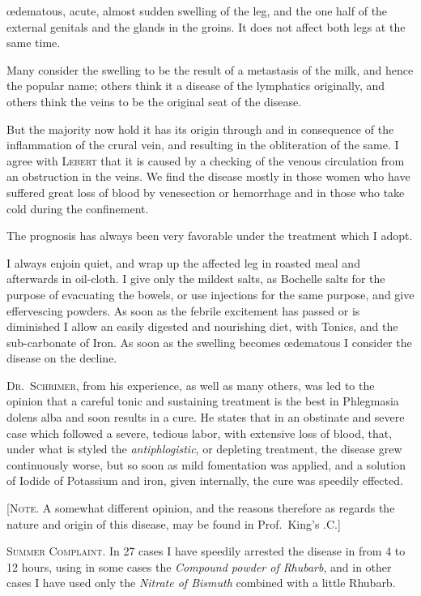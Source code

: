 œdematous, acute, almost sudden swelling of the leg, and the one half
of the external genitals and the glands in the groins. It does not
affect both legs at the same time.

Many consider the swelling to be the result of a metastasis of the
milk, and hence the popular name; others think it a disease of the
lymphatics originally, and others think the veins to be the original
seat of the disease.

But the majority now hold it has its origin through and in consequence
of the inflammation of the crural vein, and resulting in the
obliteration of the same. I agree with \textsc{Lebert} that it is caused by a
checking of the venous circulation from an obstruction in the veins.
We find the disease mostly in those women who have suffered great
loss of blood by venesection or hemorrhage and in those who take cold
during the confinement.

The prognosis has always been very favorable under the treatment
which I adopt.

I always enjoin quiet, and wrap up the affected leg in roasted meal
and afterwards in oil-cloth. I give only the mildest salts, as Bochelle
salts for the purpose of evacuating the bowels, or use injections for
the same purpose, and give effervescing powders. As soon as the
febrile excitement has passed or is diminished I allow an easily digested
and nourishing diet, with Tonics, and the sub-carbonate of Iron. As
soon as the swelling becomes œdematous I consider the disease on the
decline.

\textsc{Dr.~Schrimer}, from his experience, as well as many others, was led
to the opinion that a careful tonic and sustaining treatment is the best
in Phlegmasia dolens alba and soon results in a cure. He states that
in an obstinate and severe case which followed a severe, tedious labor,
with extensive loss of blood, that, under what is styled the \emph{antiphlogistic},
or depleting treatment, the disease grew continuously worse, but
so soon as mild fomentation was applied, and a solution of Iodide of
Potassium and iron, given internally, the cure was speedily effected.

[\textsc{Note}. A somewhat different opinion, and the reasons therefore as
regards the nature and origin of this disease, may be found in Prof.~King's
.\hfill{}C.]

\textsc{Summer Complaint}. In 27 cases I have speedily arrested the disease
in from 4 to 12 hours, using in some cases the \emph{Compound powder
of Rhubarb}, and in other cases I have used only the \emph{Nitrate of Bismuth}
combined with a little Rhubarb.\endinput

